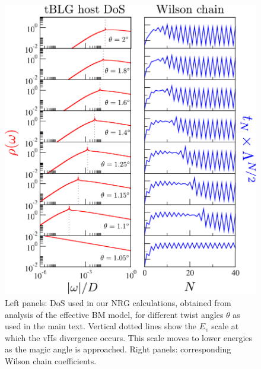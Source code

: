 
\begin{figure}[t!]
	\centering
	\includegraphics[width = \linewidth]{figures/chapter2/DoS_wc_labels.pdf}
	\caption{
		\small Left panels: DoS used in our NRG calculations, obtained from analysis of the effective BM model, for different twist angles $\theta$ as used in the main text. Vertical dotted lines show the $E_v$ scale at which the vHs divergence occurs. This scale moves to lower energies as the magic angle is approached. Right panels: corresponding Wilson chain coefficients.}
	\label{fig:wc}
\end{figure}

